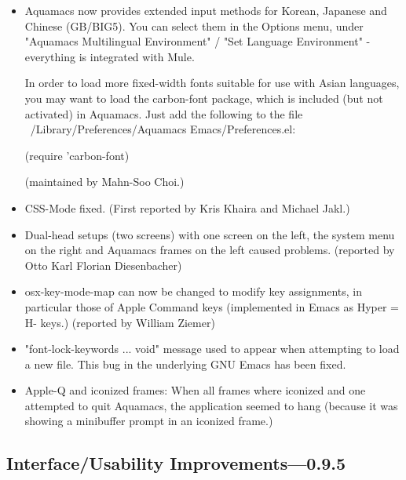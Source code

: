 \begin{itemize}
\item Aquamacs now provides extended input methods for
        Korean, Japanese and Chinese (GB/BIG5). You can select them in
        the Options menu, under "Aquamacs Multilingual Environment" /
        "Set Language Environment" - everything is integrated with
        Mule.

        In order to load more fixed-width fonts suitable for use with
        Asian languages, you may want to load the carbon-font package,
        which is included (but not activated) in Aquamacs. Just add the
        following to the file
        ~/Library/Preferences/Aquamacs Emacs/Preferences.el:

        (require 'carbon-font)

        (maintained by   Mahn-Soo Choi.)

\item CSS-Mode fixed.
        (First reported by Kris Khaira and Michael Jakl.)

\item Dual-head setups (two screens) with one screen on the left,
        the system menu on the right and Aquamacs frames on the left
        caused problems.
        (reported by Otto Karl Florian Diesenbacher)

\item osx-key-mode-map can now be changed to modify key
        assignments, in particular those of Apple Command keys
         (implemented in Emacs as Hyper = H- keys.)
        (reported by William Ziemer)

\item "font-lock-keywords ... void" message used to appear when
        attempting to load a new file. This bug in the underlying GNU
        Emacs has been fixed.

      \item Apple-Q and iconized frames: When all frames where
        iconized and one attempted to quit Aquamacs, the application
        seemed to hang (because it was showing a minibuffer prompt in
        an iconized frame.)

\end{itemize}


\subsection{Interface/Usability Improvements---0.9.5}


